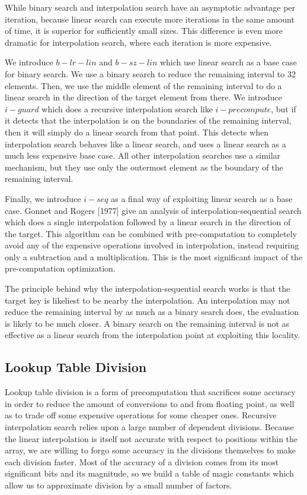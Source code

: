 \documentclass[twocolumn]{article}
\begin{document}
While binary search and interpolation search have an asymptotic advantage per iteration, because linear search can execute more iterations in the same amount of time, it is superior for sufficiently small sizes. This difference is even more dramatic for interpolation search, where each iteration is more expensive.

We introduce $b-lr-lin$ and $b-sz-lin$ which use linear search as a base case for binary search. We use a binary search to reduce the remaining interval to 32 elements. Then, we use the middle element of the remaining interval to do a linear search in the direction of the target element from there. We introduce $i-guard$ which does a recursive interpolation search like $i-precompute$, but if it detects that the interpolation is on the boundaries of the remaining interval, then it will simply do a linear search from that point. This detects when interpolation search behaves like a linear search, and uses a linear search as a much less expensive base case. All other interpolation searches use a similar mechanism, but they use only the outermost element as the boundary of the remaining interval.

Finally, we introduce $i-seq$ as a final way of exploiting linear search as a base case. Gonnet and Rogers [1977] give an analysis of interpolation-sequential search which does a single interpolation followed by a linear search in the direction of the target. This algorithm can be combined with pre-computation to completely avoid any of the expensive operations involved in interpolation, instead requiring only a subtraction and a multiplication. This is the most significant impact of the pre-computation optimization.

The principle behind why the interpolation-sequential search works is that the target key is likeliest to be nearby the interpolation. An interpolation may not reduce the remaining interval by as much as a binary search does, the evaluation is likely to be much closer. A binary search on the remaining interval is not as effective as a linear search from the interpolation point at exploiting this locality.

\subsection{Lookup Table Division}
Lookup table division is a form of precomputation that sacrifices some accuracy in order to reduce the amount of conversions to and from floating point, as well as to trade off some expensive operations for some cheaper ones. Recursive interpolation search relies upon a large number of dependent divisions. Because the linear interpolation is itself not accurate with respect to positions within the array, we are willing to forgo some accuracy in the divisions themselves to make each division faster. Most of the accuracy of a division comes from its most significant bits and its magnitude, so we build a table of magic constants which allow us to approximate division by a small number of factors.
\end{document}
